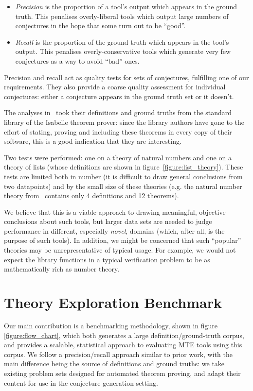 \begin{itemize}
\item \emph{Precision} is the proportion of a tool's output which appears in
  the ground truth. This penalises overly-liberal tools which output large
  numbers of conjectures in the hope that some turn out to be ``good''.
\item \emph{Recall} is the proportion of the ground truth which appears in the
  tool's output. This penalises overly-conservative tools which generate very
  few conjectures as a way to avoid ``bad'' ones.
\end{itemize}

Precision and recall act as quality tests for sets of conjectures, fulfilling
one of our requirements. They also provide a coarse quality assessment for
individual conjectures: either a conjecture appears in the ground truth set or
it doesn't.

The analyses in~\cite{claessen2013automating} took their definitions and ground
truths from the standard library of the Isabelle theorem prover: since the
library authors have gone to the effort of stating, proving and including these
theorems in every copy of their software, this is a good indication that they
are interesting.

Two tests were performed: one on a theory of natural numbers and one on a theory
of lists (whose definitions are shown in figure~\ref{figure:list_theory}). These
tests are limited both in number (it is difficult to draw general conclusions
from two datapoints) and by the small size of these theories (e.g. the natural
number theory from~\cite{Johansson.Dixon.Bundy:conjecture-generation} contains
only 4 definitions and 12 theorems).

We believe that this is a viable approach to drawing meaningful, objective
conclusions about such tools, but larger data sets are needed to judge
performance in different, especially \emph{novel}, domains (which, after all, is
the purpose of such tools). In addition, we might be concerned that such
``popular'' theories may be unrepresentative of typical usage. For example, we
would not expect the library functions in a typical verification problem to be
as mathematically rich as number theory.

\section{Theory Exploration Benchmark}
\label{sec:proposal}

Our main contribution is a benchmarking methodology, shown in figure
\ref{figure:flow_chart}, which both generates a large definition/ground-truth
corpus, and provides a scalable, statistical approach to evaluating MTE tools
using this corpus. We follow a precision/recall approach similar to prior work,
with the main difference being the source of definitions and ground truths: we
take existing problem sets designed for automated theorem proving, and adapt
their content for use in the conjecture generation setting.

